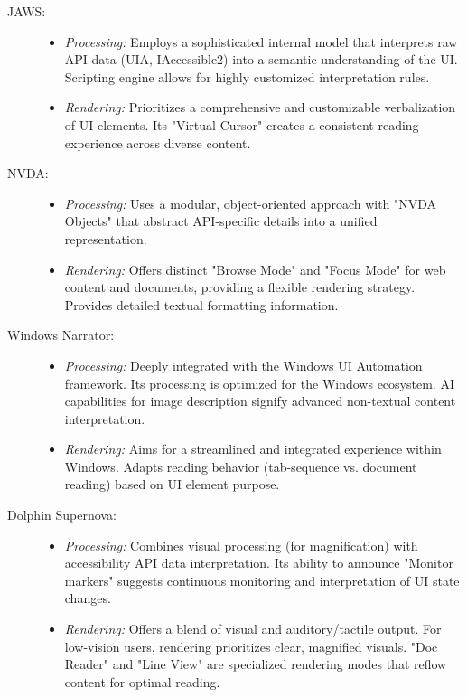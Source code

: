 \begin{description}
    \item[JAWS:]
    \begin{itemize}
        \item \emph{Processing:} Employs a sophisticated internal model that interprets raw API data (UIA, IAccessible2) into a semantic understanding of the UI. Scripting engine allows for highly customized interpretation rules. \cite{JAWSInspect}
        \item \emph{Rendering:} Prioritizes a comprehensive and customizable verbalization of UI elements. Its "Virtual Cursor" creates a consistent reading experience across diverse content. \cite{JAWSKeyboardGestures}
    \end{itemize}
    \item[NVDA:]
    \begin{itemize}
        \item \emph{Processing:} Uses a modular, object-oriented approach with "NVDA Objects" that abstract API-specific details into a unified representation. \cite{AssistivLabsNVDAArch}
        \item \emph{Rendering:} Offers distinct "Browse Mode" and "Focus Mode" for web content and documents, providing a flexible rendering strategy. \cite{NVDAKeyboardCommands} Provides detailed textual formatting information.
    \end{itemize}
    \item[Windows Narrator:]
    \begin{itemize}
        \item \emph{Processing:} Deeply integrated with the Windows UI Automation framework. Its processing is optimized for the Windows ecosystem. \cite{NarratorTechDetails} AI capabilities for image description signify advanced non-textual content interpretation. \cite{NarratorImageDescriptions}
        \item \emph{Rendering:} Aims for a streamlined and integrated experience within Windows. Adapts reading behavior (tab-sequence vs. document reading) based on UI element purpose. \cite{NarratorTechDetails}
    \end{itemize}
    \item[Dolphin Supernova:]
    \begin{itemize}
        \item \emph{Processing:} Combines visual processing (for magnification) with accessibility API data interpretation. \cite{SuperNovaFeatures} Its ability to announce "Monitor markers" suggests continuous monitoring and interpretation of UI state changes.
        \item \emph{Rendering:} Offers a blend of visual and auditory/tactile output. For low-vision users, rendering prioritizes clear, magnified visuals. "Doc Reader" and "Line View" are specialized rendering modes that reflow content for optimal reading. \cite{SuperNovaFeatures}
    \end{itemize}
\end{description}

